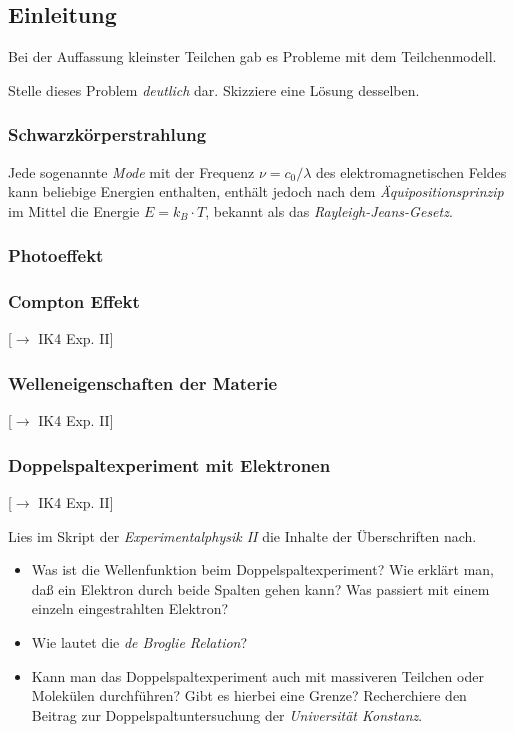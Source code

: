 \documentclass{article}
\begin{document}
    \subsection*{Einleitung}
        Bei der Auffassung kleinster Teilchen gab es Probleme mit dem Teilchenmodell. 
        \begin{Aufgabe}
            \nr{} Stelle dieses Problem \emph{deutlich} dar. Skizziere eine Lösung desselben. 
        \end{Aufgabe}
        \subsubsection*{Schwarzkörperstrahlung}
            Jede sogenannte \emph{Mode} mit der Frequenz $\nu = c_0/\lambda$ des elektromagnetischen Feldes kann beliebige Energien enthalten, enthält jedoch nach dem \emph{Äquipositionsprinzip} im Mittel die Energie $E = k_B\cdot T$, bekannt als das \emph{Rayleigh-Jeans-Gesetz}. 

        \subsubsection*{Photoeffekt}

        \subsubsection*{Compton Effekt}
            [$\to$ IK4 Exp. II] 

        \subsubsection*{Welleneigenschaften der Materie}
            [$\to$ IK4 Exp. II]

        \subsubsection*{Doppelspaltexperiment mit Elektronen}
            [$\to$ IK4 Exp. II]

        
        \begin{Aufgabe}
            \nr{} Lies im Skript der \emph{Experimentalphysik II} die Inhalte der Überschriften nach. 
            \begin{itemize}[label=$\to$]
                \item {}Was ist die Wellenfunktion beim Doppelspaltexperiment? Wie erklärt man, daß ein Elektron durch beide Spalten gehen kann? Was passiert mit einem einzeln eingestrahlten Elektron?
                \item {}Wie lautet die \emph{de Broglie Relation}?
                \item {}Kann man das Doppelspaltexperiment auch mit massiveren Teilchen oder Molekülen durchführen? Gibt es hierbei eine Grenze? Recherchiere den Beitrag zur Doppelspaltuntersuchung der \emph{Universität Konstanz}.
            \end{itemize}
        \end{Aufgabe}
\end{document}
